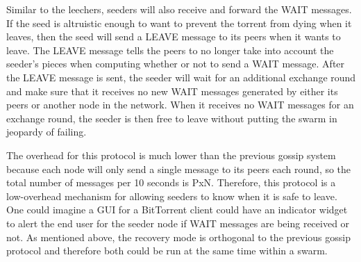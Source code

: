 Similar to the leechers, seeders will also receive and forward the WAIT messages. If the 
seed is altruistic enough to want to prevent the torrent from dying when it leaves,
then the seed will send a LEAVE message to its peers when it wants to leave. The LEAVE
message tells the peers to no longer take into account the seeder's pieces when computing
whether or not to send a WAIT message. After the LEAVE message is sent, the seeder will
wait for an additional exchange round and make sure that it receives no new WAIT messages
generated by either its peers or another node in the network. When it receives no WAIT
messages for an exchange round, the seeder is then free to leave without putting the 
swarm in jeopardy of failing. 

The overhead for this protocol is much lower than the previous gossip
system because each node will only send a single message to its peers
each round, so the total number of messages per 10 seconds is PxN. Therefore,
this protocol is a low-overhead mechanism for allowing seeders to know when it is safe
to leave. One could imagine a GUI for a BitTorrent client could have an indicator widget
to alert the end user for the seeder node if WAIT messages are being received or not. As
mentioned above, the recovery mode is orthogonal to the previous gossip
protocol and therefore both could be run at the same time within a swarm.
